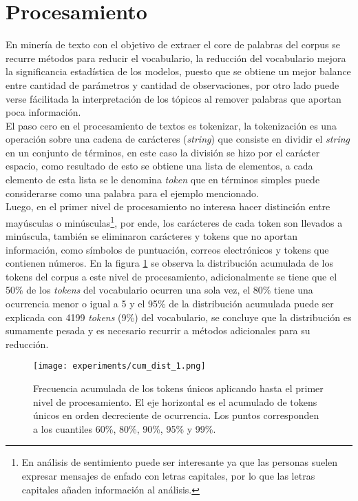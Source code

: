 \documentclass[letterpaper,12pt,oneside]{book} %
\begin{document}
\section{Procesamiento}

En minería de texto con el objetivo de extraer el core de palabras del corpus se recurre métodos para reducir el vocabulario, la reducción del vocabulario mejora la significancia estadística de los modelos, puesto que se obtiene un mejor balance entre cantidad de parámetros y cantidad de observaciones, por otro lado puede verse fácilitada la interpretación de los tópicos al remover palabras que aportan poca información. \\

El paso cero en el procesamiento de textos es tokenizar, la tokenización es una operación sobre una cadena de carácteres (\textit{string}) que consiste en dividir el \textit{string} en un conjunto de términos, en este caso la división se hizo por el carácter espacio, como resultado de esto se obtiene una lista de elementos, a cada elemento de esta lista se le denomina \textit{token} que en términos simples puede considerarse como una palabra para el ejemplo mencionado. \\

Luego, en el primer nivel de procesamiento no interesa hacer distinción entre mayúsculas o minúsculas\footnote{En análisis de sentimiento puede ser interesante ya que las personas suelen expresar mensajes de enfado con letras capitales, por lo que las letras capitales añaden información al análisis.}, por ende, los carácteres de cada token son llevados a minúscula, también se eliminaron carácteres y tokens que no aportan información, como símbolos de puntuación, correos electrónicos y tokens que contienen números. En la figura \ref{img:cum_dist1} se observa la distribución acumulada de los tokens del corpus a este nivel de procesamiento, adicionalmente se tiene que el 50\% de los \textit{tokens} del vocabulario ocurren una sola vez, el 80\% tiene una ocurrencia menor o igual a 5 y el 95\% de la distribución acumulada puede ser explicada con 4199 \textit{tokens} (9\%) del vocabulario, se concluye que la distribución es sumamente pesada y es necesario recurrir a métodos adicionales para su reducción.\\

\begin{figure}
    \centering
    \texttt{[image: experiments/cum\_dist\_1.png]}
    \caption{Frecuencia acumulada de los tokens únicos aplicando hasta el primer nivel de procesamiento. El eje horizontal es el acumulado de tokens únicos en orden decreciente de ocurrencia. Los puntos corresponden a los cuantiles 60\%, 80\%, 90\%, 95\% y 99\%.}
    \label{img:cum_dist1}
\end{figure}
\end{document}
